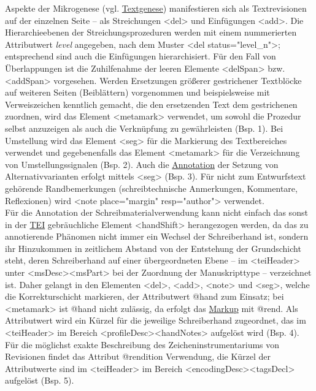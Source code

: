 \documentclass{article}
\begin{document}
    Aspekte der Mikrogenese (vgl. \href{http://gams.uni-graz.at/o:konde.28}{Textgenese}) manifestieren sich als Textrevisionen auf der einzelnen
                  Seite – als Streichungen <del> und Einfügungen
                     <add>. Die Hierarchieebenen der Streichungsprozeduren werden
                  mit einem nummerierten Attributwert \emph{level} angegeben, nach
                  dem Muster <del status="level_n">; entsprechend sind auch die
                  Einfügungen hierarchisiert. Für den Fall von Überlappungen ist die Zuhilfenahme
                  der leeren Elemente <delSpan> bzw. <addSpan>
                  vorgesehen. Werden Ersetzungen größerer gestrichener Textblöcke auf weiteren
                  Seiten (Beiblättern) vorgenommen und beispielsweise mit Verweiszeichen kenntlich
                  gemacht, die den ersetzenden Text dem gestrichenen zuordnen, wird das Element
                     <metamark> verwendet, um sowohl die Prozedur selbst
                  anzuzeigen als auch die Verknüpfung zu gewährleisten (Bsp. 1). Bei Umstellung wird
                  das Element <seg> für die Markierung des Textbereiches
                  verwendet und gegebenenfalls das Element <metamark> für die
                  Verzeichnung von Umstellungssignalen (Bsp. 2). Auch die \href{http://gams.uni-graz.at/o:konde.17}{Annotation} der Setzung von Alternativvarianten
                  erfolgt mittels <seg> (Bsp. 3). Für nicht zum Entwurfstext
                  gehörende Randbemerkungen (schreibtechnische Anmerkungen, Kommentare, Reflexionen)
                  wird <note place="margin" resp="author"> verwendet. \\
            
        Für die Annotation der Schreibmaterialverwendung kann nicht einfach das sonst in
                  der \href{http://gams.uni-graz.at/o:konde.178}{TEI} gebräuchliche Element
                     <handShift> herangezogen werden, da das zu annotierende
                  Phänomen nicht immer ein Wechsel der Schreiberhand ist, sondern ihr Hinzukommen in
                  zeitlichem Abstand von der Entstehung der Grundschicht steht, deren Schreiberhand
                  auf einer übergeordneten Ebene – im <teiHeader> unter
                     <msDesc><msPart> bei der Zuordnung der Manuskripttype
                  – verzeichnet ist. Daher gelangt in den Elementen <del>,
                     <add>, <note> und
                     <seg>, welche die Korrekturschicht markieren, der
                  Attributwert @hand zum Einsatz; bei <metamark> ist @hand nicht zulässig, da erfolgt das \href{http://gams.uni-graz.at/o:konde.126}{Markup} mit @rend. Als Attributwert wird ein Kürzel für die jeweilige Schreiberhand
                  zugeordnet, das im <teiHeader> im Bereich
                     <profileDesc><handNotes> aufgelöst wird (Bsp. 4). Für
                  die möglichst exakte Beschreibung des Zeicheninstrumentariums von Revisionen
                  findet das Attribut @rendition Verwendung, die Kürzel der Attributwerte sind im
                     <teiHeader> im Bereich
                     <encodingDesc><tagsDecl> aufgelöst (Bsp. 5).\\
            
\end{document}
